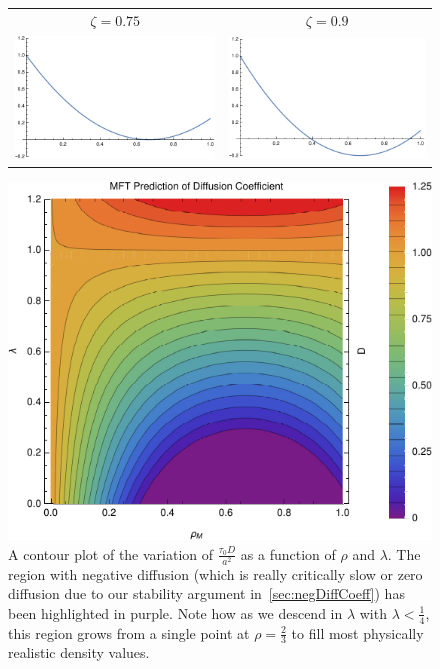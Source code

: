 \begin{figure}[h!]
\begin{center}
\begin{tabular}{c c}
     $\zeta = 0.75$  & $\zeta = 0.9$ \\
     \includegraphics[width=0.49\linewidth]{analytics/images/diffCoeffs/diffCoeff-0-75}  & \includegraphics[width=0.49 \linewidth]{analytics/images/diffCoeffs/diffCoeff-0-9} \\
    \end{tabular}
\end{center}
    \vspace{-2em}
\end{figure}

\begin{figure}[h!]
 \caption[A contour plot of the variation of the MFT diffusion coefficient with density and stickiness.]{\label{fig:diffCoeffDensityPlot} A contour plot of the variation of $\frac{\tau_0 D}{a^2}$ as a function of $\rho$ and $\lambda$. The region with negative diffusion (which is really critically slow or zero diffusion due
 to our stability argument in~\ref{sec:negDiffCoeff}) has been highlighted in purple. Note how as we descend in $\lambda$ with $\lambda<\frac{1}{4}$, this region grows from a single point at $ \rho = \frac{2}{3}$
 to fill most physically realistic density values.}
 \includegraphics[width=0.99\linewidth]{analytics/images/newAnalFlow}
\end{figure}


